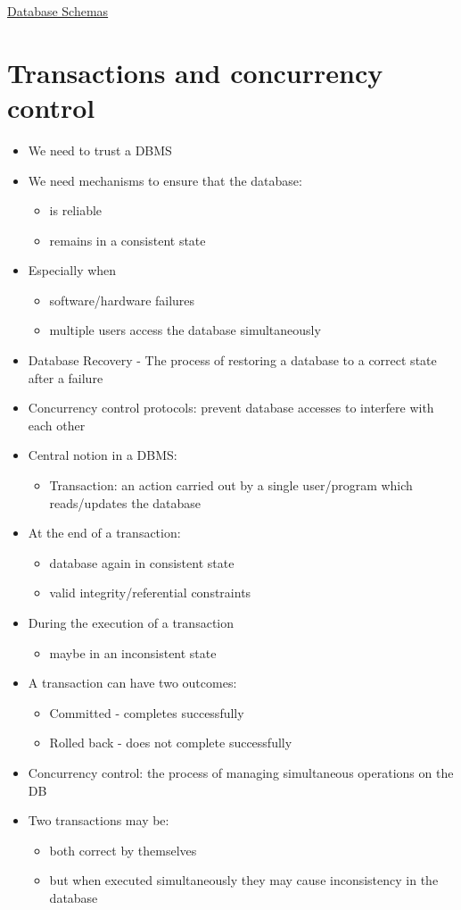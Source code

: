 \documentclass{article}[18pt]
\begin{document}
\begin{center}
\underline{\huge Database Schemas }
\end{center}
\section{Transactions and concurrency control}
\begin{itemize}
	\item We need to trust a DBMS
	\item We need mechanisms to ensure that the database:
	\begin{itemize}
		\item is reliable
		\item remains in a consistent state
	\end{itemize}
	\item Especially when
	\begin{itemize}
		\item software/hardware failures
		\item multiple users access the database simultaneously
	\end{itemize}
	\item Database Recovery - The process of restoring a database to a correct state after a failure
	\item Concurrency control protocols: prevent database accesses to interfere with each other
	\item Central notion in a DBMS:
	\begin{itemize}
		\item Transaction: an action carried out by a single user/program which reads/updates the database
	\end{itemize}
	\item At the end of a transaction:
	\begin{itemize}
		\item database again in consistent state
		\item valid integrity/referential constraints
	\end{itemize}
	\item During the execution of a transaction
	\begin{itemize}
		\item maybe in an inconsistent state
	\end{itemize}
	\item A transaction can have two outcomes:
	\begin{itemize}
		\item Committed - completes successfully
		\item Rolled back - does not complete successfully
	\end{itemize}
	\item Concurrency control: the process of managing simultaneous operations on the DB
	\item Two transactions may be:
	\begin{itemize}
		\item both correct by themselves
		\item but when executed simultaneously they may cause inconsistency in the database
	\end{itemize}
\end{itemize}
\end{document}
